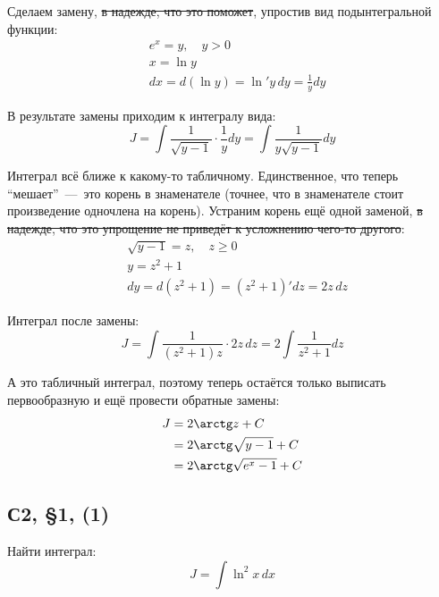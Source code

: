 \documentclass[a4paper,12pt]{article}
\begin{document}
  \begin{solution}
    Сделаем замену, \sout{в надежде, что это поможет}, упростив вид подынтегральной функции:
    \[
      \begin{aligned}
        &e^x = y,\quad y > 0\\
        &x = \ln y\\
        &dx = d(\ln y) = \ln'\! y\, dy = \frac{1}{y} dy
      \end{aligned}
    \]
    
    В результате замены приходим к интегралу вида:
    \[
      J = \int \frac{1}{\sqrt{y - 1}} \cdot \frac{1}{y} dy = \int \frac{1}{y \sqrt{y - 1}} dy
    \]
    
    Интеграл всё ближе к какому-то табличному.
    Единственное, что теперь ``мешает''~---~это корень в знаменателе (точнее, что в знаменателе стоит произведение одночлена на корень).
    Устраним корень ещё одной заменой, \sout{в надежде, что это упрощение не приведёт к усложнению чего-то другого}:
    \[
      \begin{aligned}
        &\sqrt{y - 1} = z,\quad z \geq 0\\
        &y = z^2 + 1\\
        &dy = d(z^2 + 1) = (z^2 + 1)' dz = 2z\, dz
      \end{aligned}
    \]
    
    Интеграл после замены:
    \[
      J = \int \frac{1}{(z^2 + 1) z} \cdot 2z\, dz = 2 \int \frac{1}{z^2 + 1} dz
    \]
    
    А это табличный интеграл, поэтому теперь остаётся только выписать первообразную и ещё провести обратные замены:
    \begin{equation*}
    \begin{split}
      J &= 2 \arctg z + C\\
        &= 2 \arctg \sqrt{y - 1} + C\\
        &= 2 \arctg \sqrt{e^x - 1} + C
    \end{split}
    \end{equation*}
  \end{solution}
  
  
  \subsection{С2, \S 1, (1)}
  
  Найти интеграл:
  \[
    J = \int \ln^2 x\, dx
  \]
  
\end{document}
